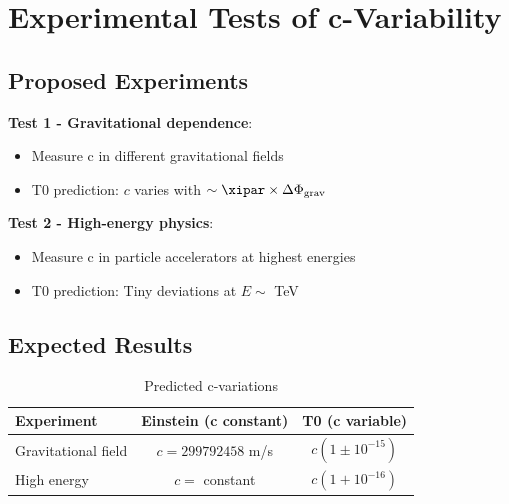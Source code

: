 	\section{Experimental Tests of c-Variability}
	
	\subsection{Proposed Experiments}
	
	\textbf{Test 1 - Gravitational dependence}:
	\begin{itemize}
		\item Measure c in different gravitational fields
		\item T0 prediction: $c$ varies with $\sim \xipar \times \Delta\Phi_{\text{grav}}$
	\end{itemize}

	\textbf{Test 2 - High-energy physics}:
	\begin{itemize}
		\item Measure c in particle accelerators at highest energies
		\item T0 prediction: Tiny deviations at $E \sim$ TeV
	\end{itemize}
	
	\subsection{Expected Results}
	
	\begin{table}[htbp]
		\centering
		\begin{tabular}{|l|c|c|}
			\hline
			\textbf{Experiment} & \textbf{Einstein (c constant)} & \textbf{T0 (c variable)} \\
			\hline
			Gravitational field & $c = 299792458$ m/s & $c(1 \pm 10^{-15})$ \\
			High energy & $c = $ constant & $c(1 + 10^{-16})$ \\
			\hline
		\end{tabular}
		\caption{Predicted c-variations}
	\end{table}
	